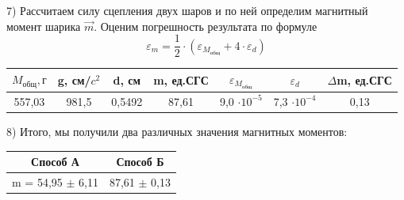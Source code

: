 \documentclass[a4paper,12pt]{article}
\begin{document}
7) Рассчитаем силу сцепления двух шаров и по ней определим магнитный момент шарика $\vec{m}$. Оценим погрешность результата по формуле $$ \varepsilon_m = \frac{1}{2} \cdot (\varepsilon_{M_{общ}} + 4 \cdot \varepsilon_d) $$

\begin{center}
\begin{tabular}{|c|c|c|c|c|c|c|}
	\hline
	$M_{общ}, г$ & g, см/$c^2$ & d, см & m, ед.СГС & $\varepsilon_{M_{общ}}$ & $\varepsilon_d$ & $\Delta$m, ед.СГС \\
	\hline
	557,03 & 981,5 & 0,5492 & 87,61 & 9,0 $\cdot 10^{-5}$ & 7,3 $\cdot 10^{-4}$ & 0,13 \\
	\hline
\end{tabular}
\end{center}

8) Итого, мы получили два различных значения магнитных моментов: 
\begin{center}
\begin{tabular}{|c|c|}
	\hline
	Способ А & Способ Б \\
	\hline
	m = 54,95 $\pm$ 6,11 & 87,61 $\pm$ 0,13 \\
	\hline
\end{tabular}
\end{center}
\end{document}

